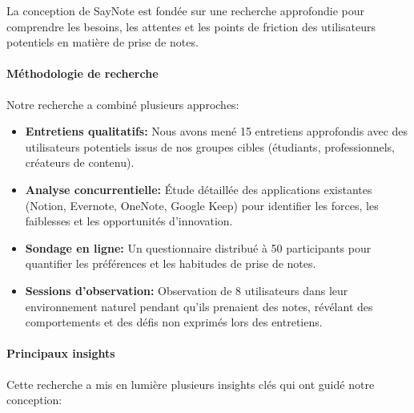     La conception de SayNote est fondée sur une recherche approfondie pour comprendre les besoins, les attentes et les points de friction des utilisateurs potentiels en matière de prise de notes.
    
    \paragraph{Méthodologie de recherche}
    
    Notre recherche a combiné plusieurs approches:
    
    \begin{itemize}
        \item \textbf{Entretiens qualitatifs:} Nous avons mené 15 entretiens approfondis avec des utilisateurs potentiels issus de nos groupes cibles (étudiants, professionnels, créateurs de contenu).
        
        \item \textbf{Analyse concurrentielle:} Étude détaillée des applications existantes (Notion, Evernote, OneNote, Google Keep) pour identifier les forces, les faiblesses et les opportunités d'innovation.
        
        \item \textbf{Sondage en ligne:} Un questionnaire distribué à 50 participants pour quantifier les préférences et les habitudes de prise de notes.
        
        \item \textbf{Sessions d'observation:} Observation de 8 utilisateurs dans leur environnement naturel pendant qu'ils prenaient des notes, révélant des comportements et des défis non exprimés lors des entretiens.
    \end{itemize}
    
    \paragraph{Principaux insights}
    
    Cette recherche a mis en lumière plusieurs insights clés qui ont guidé notre conception:
    
